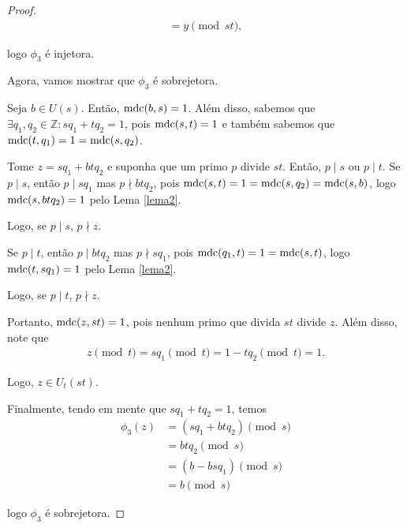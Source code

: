 \begin{proof}
\begin{align*}
            = y\pmod {st},
		\end{align*}
		\par\vspace{0.3cm} logo $\phi_3$ é injetora. 
		\par\vspace{0.3cm} Agora, vamos mostrar que $\phi_3$ é sobrejetora.
		\par\vspace{0.3cm} Seja $b\in U(s)$. Então, $\operatorname{mdc}(b,s) = 1$.
		Além disso, sabemos que 
		$\exists q_1, q_2\in\mathbb{Z}: sq_1 + tq_2 = 1$, pois 
		$\operatorname{mdc}(s,t) = 1$ e também sabemos que $\operatorname{mdc}(t,q_1) = 1 = \operatorname{mdc}(s, q_2)$.
		\par\vspace{0.3cm} Tome $z = sq_1 + btq_2$ e suponha que um primo 
		$p$ divide $st$. Então, $p\mid s$ ou $p\mid t$. Se $p\mid s$, então
		$p\mid sq_1$ mas $p\nmid btq_2$, pois 
		$\operatorname{mdc}(s,t) = 1 = \operatorname{mdc}(s,q_2) = \operatorname{mdc}(s,b)$, logo $\operatorname{mdc}(s, btq_2) = 1$
		pelo Lema \ref{lema2}.
		\par\vspace{0.3cm} Logo, se $p\mid s$, $p\nmid z$.
		\par\vspace{0.3cm} Se $p\mid t$, então $p\mid btq_2$ mas 
		$p\nmid sq_1$, pois $\operatorname{mdc}(q_1, t) = 1 = \operatorname{mdc}(s,t)$, logo 
		$\operatorname{mdc}(t, sq_1) = 1$ pelo Lema \ref{lema2}.
		\par\vspace{0.3cm} Logo, se $p\mid t$, $p\nmid z$.
		\par\vspace{0.3cm} Portanto, $\operatorname{mdc}(z, st) = 1$, pois nenhum 
		primo que divida $st$ divide $z$. Além disso, note que 
		\begin{align*}
		    z\pmod t 
		    = sq_1\pmod t 
		    = 1 - tq_2 \pmod t 
		    = 1.
		\end{align*} 
		\par\vspace{0.3cm} Logo, $z\in U_t(st)$.
		\par\vspace{0.3cm} Finalmente, tendo em mente que 
		$sq_1 + tq_2 = 1$, temos
		\begin{align*}
		\phi_3(z) 
		&= (sq_1 + btq_2)\pmod s \\ 
		&= btq_2\pmod s \\ 
		&= (b - bsq_1)\pmod s \\ 
		&= b\pmod s
		\end{align*}
		\par\vspace{0.3cm}logo $\phi_3$ é sobrejetora.
	\end{proof}

